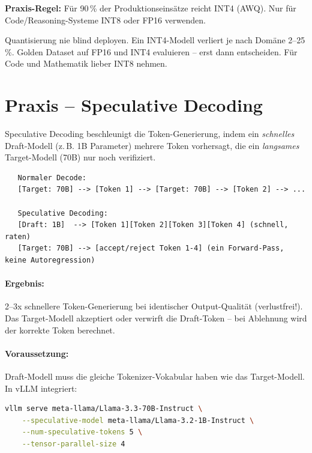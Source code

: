 \textbf{Praxis-Regel:} Für 90\,\% der Produktionseinsätze reicht INT4 (AWQ). Nur für Code/Reasoning-Systeme INT8 oder FP16 verwenden.

\begin{praxishinweis}
Quantisierung nie blind deployen. Ein INT4-Modell verliert je nach Domäne 2--25\,\%. Golden Dataset auf FP16 und INT4 evaluieren -- erst dann entscheiden. Für Code und Mathematik lieber INT8 nehmen.
\end{praxishinweis}

\section{Praxis -- Speculative Decoding}

Speculative Decoding beschleunigt die Token-Generierung, indem ein \textit{schnelles} Draft-Modell (z.\,B. 1B Parameter) mehrere Token vorhersagt, die ein \textit{langsames} Target-Modell (70B) nur noch verifiziert.

\begin{verbatim}
   Normaler Decode:
   [Target: 70B] --> [Token 1] --> [Target: 70B] --> [Token 2] --> ...
   
   Speculative Decoding:
   [Draft: 1B]  --> [Token 1][Token 2][Token 3][Token 4] (schnell, raten)
   [Target: 70B] --> [accept/reject Token 1-4] (ein Forward-Pass, keine Autoregression)
\end{verbatim}

\paragraph{Ergebnis:} 2--3x schnellere Token-Generierung bei identischer Output-Qualität (verlustfrei!). Das Target-Modell akzeptiert oder verwirft die Draft-Token -- bei Ablehnung wird der korrekte Token berechnet.

\paragraph{Voraussetzung:} Draft-Modell muss die gleiche Tokenizer-Vokabular haben wie das Target-Modell. In vLLM integriert:

\begin{lstlisting}[language=bash, caption=Speculative Decoding in vLLM]
vllm serve meta-llama/Llama-3.3-70B-Instruct \
    --speculative-model meta-llama/Llama-3.2-1B-Instruct \
    --num-speculative-tokens 5 \
    --tensor-parallel-size 4
\end{lstlisting}

